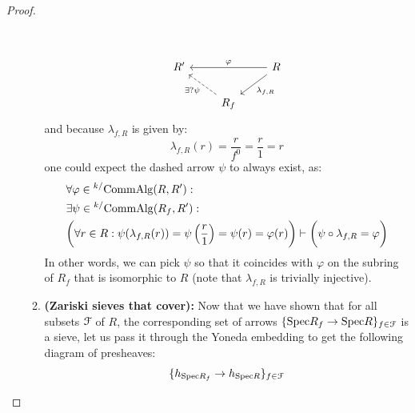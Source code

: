 \begin{proof}
\begin{enumerate}
\begin{enumerate}
                                            $$
                                                \begin{tikzcd}
                                                	{} \\
                                                	{R'} && R \\
                                                	& {R_f}
                                                	\arrow["{\exists ? \psi}", dashed, from=3-2, to=2-1]
                                                	\arrow["{\lambda_{f, R}}", from=2-3, to=3-2]
                                                	\arrow["\varphi"', from=2-3, to=2-1]
                                                \end{tikzcd}
                                            $$
                                        and because $\lambda_{f, R}$ is given by:
                                            $$\lambda_{f, R}(r) = \frac{r}{f^0} = \frac{r}{1} = r$$
                                        one could expect the dashed arrow $\psi$ to always exist, as:
                                            $$
                                                \begin{aligned}
                                                    & \forall \varphi \in {}^{k/}\mathrm{Comm}\mathrm{Alg}(R, R'):
                                                    \\
                                                    & \exists \psi \in {}^{k/}\mathrm{Comm}\mathrm{Alg}(R_f, R'):
                                                    \\
                                                    & \bigg(\forall r \in R: \psi(\lambda_{f, R}(r)) = \psi\left(\frac{r}{1}\right) = \psi(r) = \varphi(r)\bigg) \vdash \bigg(\psi \circ \lambda_{f, R} = \varphi\bigg)
                                                \end{aligned}
                                            $$
                                        In other words, we can pick $\psi$ so that it coincides with $\varphi$ on the subring of $R_f$ that is isomorphic to $R$ (note that $\lambda_{f, R}$ is trivially injective).  
                                        \item \textbf{(Zariski sieves that cover):} Now that we have shown that for all subsets $\mathcal{F}$ of $R$, the corresponding set of arrows $\{\mathrm{Spec} R_f \to \mathrm{Spec} R\}_{f \in \mathcal{F}}$ is a sieve, let us pass it through the Yoneda embedding to get the following diagram of presheaves:
                                            $$\{h_{\mathrm{Spec} R_f} \to h_{\mathrm{Spec} R}\}_{f \in \mathcal{F}}$$

\end{enumerate}
\end{enumerate}
\end{proof}
